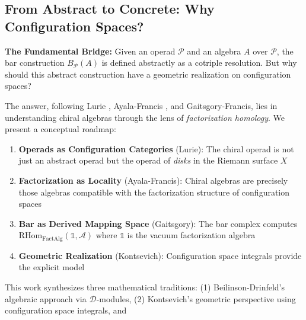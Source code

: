 \subsection{From Abstract to Concrete: Why Configuration Spaces?}

\noindent\textbf{The Fundamental Bridge:} Given an operad $\mathcal{P}$ and an algebra $A$ over $\mathcal{P}$, 
the bar construction $B_{\mathcal{P}}(A)$ is defined abstractly as a cotriple resolution. But why should 
this abstract construction have a geometric realization on configuration spaces?

The answer, following Lurie \cite{HA}, Ayala-Francis \cite{AF}, and Gaitsgory-Francis, lies in understanding 
chiral algebras through the lens of \emph{factorization homology}. We present a conceptual roadmap:

\begin{enumerate}
\item \textbf{Operads as Configuration Categories} (Lurie): The chiral operad is not just an abstract 
operad but the operad of \emph{disks} in the Riemann surface $X$

\item \textbf{Factorization as Locality} (Ayala-Francis): Chiral algebras are precisely those algebras 
compatible with the factorization structure of configuration spaces

\item \textbf{Bar as Derived Mapping Space} (Gaitsgory): The bar complex computes 
$\text{RHom}_{\text{FactAlg}}(\mathbb{1}, \mathcal{A})$ where $\mathbb{1}$ is the vacuum factorization algebra

\item \textbf{Geometric Realization} (Kontsevich): Configuration space integrals provide the explicit model
\end{enumerate}

This work synthesizes three mathematical traditions: (1) Beilinson-Drinfeld's algebraic approach via 
$\mathcal{D}$-modules, (2) Kontsevich's geometric perspective using configuration space integrals, and 

